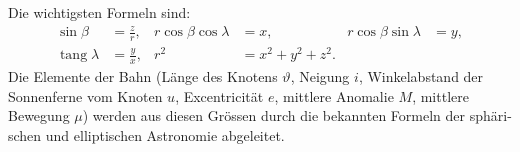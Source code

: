 \documentclass[12pt,a4paper]{article}
\DeclareMathOperator{\tang}{tang}
\begin{document}
Die wichtigsten Formeln sind:
\begin{align*}
\sin\beta &= \frac{z}{r}, & r\cos\beta\cos\lambda &= x, & r\cos\beta\sin\lambda &= y,\\
\tang\lambda &= \frac{y}{x}, & r^2 &= x^2 + y^2 + z^2.
\end{align*}
Die Elemente der Bahn (Länge des Knotens $\vartheta$, Neigung $i$, Winkelabstand
der Sonnenferne vom Knoten $u$, Excentricität $e$, mittlere Anomalie $M$, mittlere
Bewegung $\mu$) werden aus diesen Grössen durch die bekannten Formeln der sphäri-
schen und elliptischen Astronomie abgeleitet.

\newpage
\end{document}
